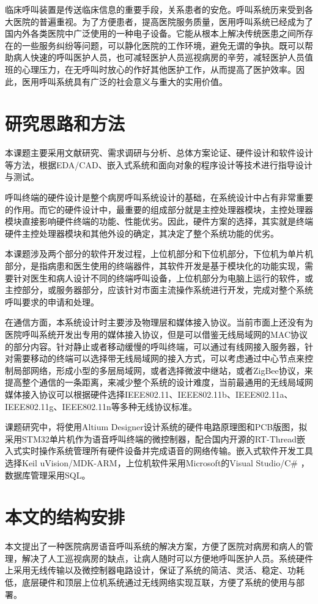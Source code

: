 临床呼叫装置是传送临床信息的重要手段，关系患者的安危。呼叫系统历来受到各大医院的普遍重视。为了方便患者，提高医院服务质量，医用呼叫系统已经成为了国内外各类医院中广泛使用的一种电子设备。它能从根本上解决传统医患之间所存在的一些服务纠纷等问题，可以静化医院的工作环境，避免无谓的争执。既可以帮助病人快速的呼叫医护人员，也可减轻医护人员巡视病房的辛劳，减轻医护人员值班的心理压力，在无呼叫时放心的作好其他医护工作，从而提高了医护效率。因此，医用呼叫系统具有广泛的社会意义与重大的实用价值。

\section{研究思路和方法}
本课题主要采用文献研究、需求调研与分析、总体方案论证、硬件设计和软件设计等方法，根据EDA/CAD、嵌入式系统和面向对象的程序设计等技术进行指导设计与测试。

呼叫终端的硬件设计是整个病房呼叫系统设计的基础，在系统设计中占有非常重要的作用。而它的硬件设计中，最重要的组成部分就是主控处理器模块，主控处理器模块直接影响硬件终端的功能、性能优劣。因此，硬件方案的选择，其实就是终端硬件主控处理器模块和其他外设的确定，其决定了整个系统功能的优劣。

本课题涉及两个部分的软件开发过程，上位机部分和下位机部分，下位机为单片机部分，是指病患和医生使用的终端器件，其软件开发是基于模块化的功能实现，需要针对医生和病人设计不同的终端呼叫设备，上位机部分为电脑上运行的软件，或主控部分，或服务器部分，应该针对市面主流操作系统进行开发，完成对整个系统呼叫要求的申请和处理。

在通信方面，本系统设计时主要涉及物理层和媒体接入协议。当前市面上还没有为医院呼叫系统开发出专用的媒体接入协议，但是可以借鉴无线局域网的MAC协议的部分内容。针对静止或者移动缓慢的呼叫终端，可以通过有线网接入服务器，针对需要移动的终端可以选择带无线局域网的接入方式，可以考虑通过中心节点来控制局部网络，形成小型的多层局域网，或者选择微波中继站，或者ZigBee协议，来提高整个通信的一条距离，来减少整个系统的设计难度，当前最通用的无线局域网媒体接入协议可以根据硬件选择IEEE802.11、IEEE802.11b、IEEE802.11a、IEEE802.11g、IEEE802.11n等多种无线协议标准。

课题研究中，将使用Altium Designer设计系统的硬件电路原理图和PCB版图，拟采用STM32单片机作为语音呼叫终端的微控制器，配合国内开源的RT-Thread嵌入式实时操作系统管理所有硬件设备并完成语音的网络传输。嵌入式软件开发工具选择Keil uVision/MDK-ARM，上位机软件采用Microsoft的Visual Studio/C\# ，数据库管理采用SQL。

\section{本文的结构安排}
本文提出了一种医院病房语音呼叫系统的解决方案，方便了医院对病房和病人的管理，解决了人工巡视病房的缺点，让病人随时可以方便地呼叫医护人员。系统硬件上采用无线传输以及微控制器电路设计，保证了系统的简洁、灵活、稳定、功耗低，底层硬件和顶层上位机系统通过无线网络实现互联，方便了系统的使用与部署。

